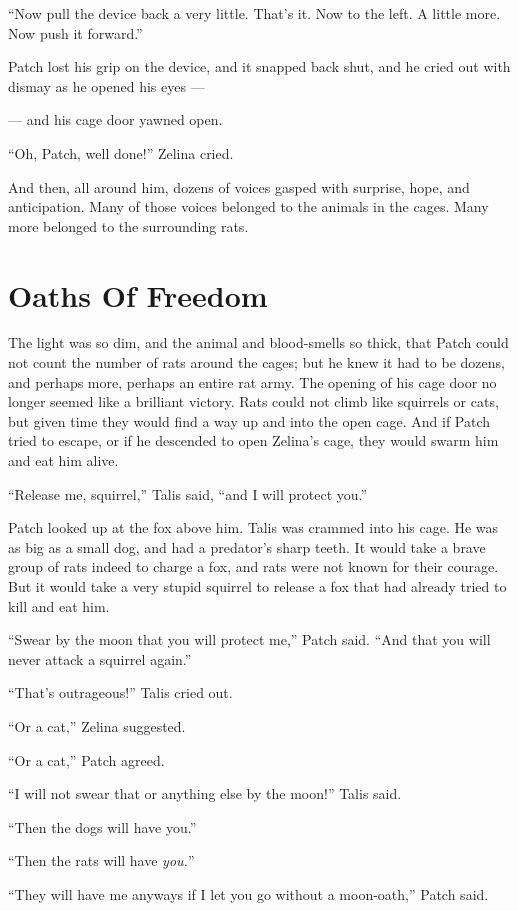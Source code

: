 \documentclass[ebook,oneside,openany,12pt]{memoir}
\begin{document}
“Now pull the device back a very little. That’s it. Now to the left. A
little more. Now push it forward.”

Patch lost his grip on the device, and it snapped back shut, and he
cried out with dismay as he opened his eyes —

— and his cage door yawned open.

“Oh, Patch, well done!” Zelina cried.

And then, all around him, dozens of voices gasped with surprise, hope,
and anticipation. Many of those voices belonged to the animals in the
cages. Many more belonged to the surrounding rats.


\section{Oaths Of Freedom}

The light was so dim, and the animal and blood-smells so thick, that
Patch could not count the number of rats around the cages; but he knew
it had to be dozens, and perhaps more, perhaps an entire rat army. The
opening of his cage door no longer seemed like a brilliant
victory. Rats could not climb like squirrels or cats, but given time
they would find a way up and into the open cage. And if Patch tried to
escape, or if he descended to open Zelina’s cage, they would swarm him
and eat him alive.

“Release me, squirrel,” Talis said, “and I will protect you.”

Patch looked up at the fox above him. Talis was crammed into his
cage. He was as big as a small dog, and had a predator’s sharp
teeth. It would take a brave group of rats indeed to charge a fox, and
rats were not known for their courage. But it would take a very stupid
squirrel to release a fox that had already tried to kill and eat him.

“Swear by the moon that you will protect me,” Patch said. “And that
you will never attack a squirrel again.”

“That’s outrageous!” Talis cried out.

“Or a cat,” Zelina suggested.

“Or a cat,” Patch agreed.

“I will not swear that or anything else by the moon!” Talis said.

“Then the dogs will have you.”

“Then the rats will have \emph{you.}”

“They will have me anyways if I let you go without a moon-oath,” Patch
said.
\end{document}
